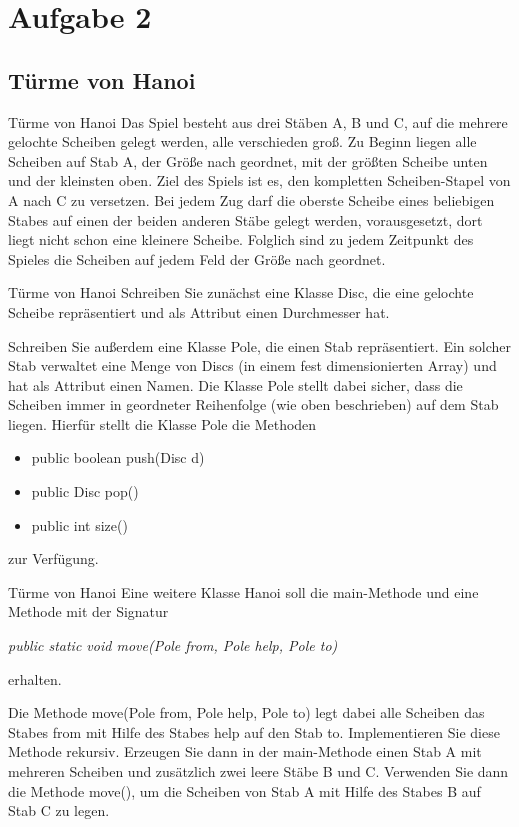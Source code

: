 \documentclass[18pt]{beamer}
\begin{document}
\section{Aufgabe 2}
\subsection*{Türme von Hanoi}
\begin{frame}{Türme von Hanoi}
	Das Spiel besteht aus drei Stäben A, B und C, auf die mehrere gelochte Scheiben gelegt werden,
	alle verschieden groß. Zu Beginn liegen alle Scheiben auf Stab A, der Größe nach geordnet, mit der
	größten Scheibe unten und der kleinsten oben. Ziel des Spiels ist es, den kompletten Scheiben-Stapel
	von A nach C zu versetzen. Bei jedem Zug darf die oberste Scheibe eines beliebigen Stabes auf einen
	der beiden anderen Stäbe gelegt werden, vorausgesetzt, dort liegt nicht schon eine kleinere Scheibe.
	Folglich sind zu jedem Zeitpunkt des Spieles die Scheiben auf jedem Feld der Größe nach geordnet.
\end{frame}

\begin{frame}{Türme von Hanoi}
	Schreiben Sie zunächst eine Klasse Disc, die eine gelochte Scheibe repräsentiert und als Attribut 			einen Durchmesser hat.\pause
	
	Schreiben Sie außerdem eine Klasse Pole, die einen Stab repräsentiert. Ein solcher Stab verwaltet eine
	Menge von Discs (in einem fest dimensionierten Array) und hat als Attribut einen Namen. Die Klasse
	Pole stellt dabei sicher, dass die Scheiben immer in geordneter Reihenfolge (wie oben beschrieben)
	auf dem Stab liegen. Hierfür stellt die Klasse Pole die Methoden
	\begin{itemize}
		\item public boolean push(Disc d)
		\item public Disc pop()	
		\item public int size()
	\end{itemize}
	zur Verfügung.
\end{frame}

\begin{frame}{Türme von Hanoi}
	Eine weitere Klasse Hanoi soll die main-Methode und eine Methode mit der Signatur
	
	\emph{public static void move(Pole from, Pole help, Pole to)} 
	
	erhalten.
	
	
	Die Methode move(Pole from, Pole help, Pole to) legt dabei alle Scheiben das
	Stabes from mit Hilfe des Stabes help auf den Stab to. Implementieren Sie diese Methode rekursiv.
	Erzeugen Sie dann in der main-Methode einen Stab A mit mehreren Scheiben und zusätzlich zwei leere
	Stäbe B und C. Verwenden Sie dann die Methode move(), um die Scheiben von Stab A mit Hilfe des
	Stabes B auf Stab C zu legen.	
\end{frame}
\end{document}
